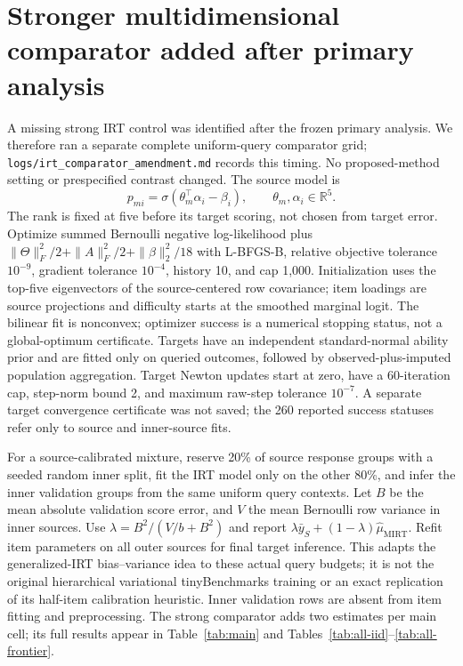 \section{Stronger multidimensional comparator added after primary analysis}\label{app:mirt}
A missing strong IRT control was identified after the frozen primary analysis. We therefore ran a separate complete uniform-query comparator grid; \texttt{logs/irt\_comparator\_amendment.md} records this timing. No proposed-method setting or prespecified contrast changed. The source model is
\begin{equation}
p_{mi}=\sigma(\theta_m^\top\alpha_i-\beta_i),\qquad \theta_m,\alpha_i\in\mathbb R^5.
\end{equation}
The rank is fixed at five before its target scoring, not chosen from target error. Optimize summed Bernoulli negative log-likelihood plus $\|\Theta\|_F^2/2+\|A\|_F^2/2+\|\beta\|_2^2/18$ with L-BFGS-B, relative objective tolerance $10^{-9}$, gradient tolerance $10^{-4}$, history 10, and cap 1,000. Initialization uses the top-five eigenvectors of the source-centered row covariance; item loadings are source projections and difficulty starts at the smoothed marginal logit. The bilinear fit is nonconvex; optimizer success is a numerical stopping status, not a global-optimum certificate. Targets have an independent standard-normal ability prior and are fitted only on queried outcomes, followed by observed-plus-imputed population aggregation. Target Newton updates start at zero, have a 60-iteration cap, step-norm bound 2, and maximum raw-step tolerance $10^{-7}$. A separate target convergence certificate was not saved; the 260 reported success statuses refer only to source and inner-source fits.

For a source-calibrated mixture, reserve 20\% of source response groups with a seeded random inner split, fit the IRT model only on the other 80\%, and infer the inner validation groups from the same uniform query contexts. Let $B$ be the mean absolute validation score error, and $V$ the mean Bernoulli row variance in inner sources. Use $\lambda=B^2/(V/b+B^2)$ and report $\lambda\bar y_S+(1-\lambda)\hat\mu_{\mathrm{MIRT}}$. Refit item parameters on all outer sources for final target inference. This adapts the generalized-IRT bias--variance idea to these actual query budgets; it is not the original hierarchical variational tinyBenchmarks training or an exact replication of its half-item calibration heuristic. Inner validation rows are absent from item fitting and preprocessing. The strong comparator adds two estimates per main cell; its full results appear in Table~\ref{tab:main} and Tables~\ref{tab:all-iid}--\ref{tab:all-frontier}.

